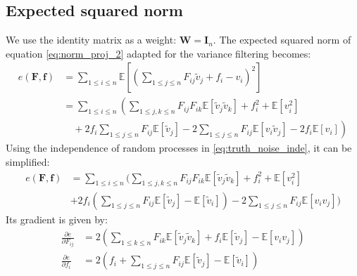 \documentclass[12pt]{scrartcl}
\begin{document}
\subsection{Expected squared norm}
We use the identity matrix as a weight: $\mathbf{W} = \mathbf{I}_n$. The expected squared norm of equation \eqref{eq:norm_proj_2} adapted for the variance filtering becomes:
\begin{align}
e(\mathbf{F},\mathbf{f}) & = \sum_{1 \le i \le n} \mathbb{E}\left[ \left(\sum_{1 \le j \le n} F_{ij} \widetilde{v}_j + f_i - v_i \right)^2 \right] \nonumber \\
& = \sum_{1 \le i \le n} \left( \sum_{1 \le j,k \le n} F_{ij} F_{ik} \mathbb{E}\left[\widetilde{v}_j \widetilde{v}_k\right] + f_i^2 + \mathbb{E}\left[v^2_i\right] \right.\nonumber \\
& \left. \quad + 2 f_i \sum_{1 \le j \le n} F_{ij} \mathbb{E}\left[\widetilde{v}_j\right] - 2 \sum_{1 \le j \le n} F_{ij} \mathbb{E}\left[v_i\widetilde{v}_j\right] - 2 f_i \mathbb{E}\left[v_i\right]\right)
\end{align}
Using the independence of random processes in \eqref{eq:truth_noise_inde}, it can be simplified:
\begin{align}
e(\mathbf{F},\mathbf{f}) & = \sum_{1 \le i \le n} \Bigg( \sum_{1 \le j,k \le n} F_{ij} F_{ik} \mathbb{E}\left[\widetilde{v}_j \widetilde{v}_k\right] + f_i^2 + \mathbb{E}\left[v^2_i\right] \nonumber \\
& + 2 f_i \left(\sum_{1 \le j \le n} F_{ij} \mathbb{E}\left[\widetilde{v}_j\right] - \mathbb{E}\left[\widetilde{v}_i\right]\right)- 2 \sum_{1 \le j \le n} F_{ij} \mathbb{E}\left[v_i v_j\right]\Bigg)
\end{align}
Its gradient is given by:
\begin{subequations}
\begin{align}
\label{eq:var_grad_1}
\frac{\partial e}{\partial F_{ij}} & = 2 \left(\sum_{1 \le k \le n}  F_{ik} \mathbb{E}\left[\widetilde{v}_j \widetilde{v}_k\right] + f_i \mathbb{E}\left[\widetilde{v}_j\right] - \mathbb{E}\left[v_i v_j\right]\right) \\
\frac{\partial e}{\partial f_i} & = 2 \left(f_i + \sum_{1 \le j \le n} F_{ij} \mathbb{E}\left[\widetilde{v}_j\right] - \mathbb{E}\left[\widetilde{v}_i\right]\right)
\end{align}
\end{subequations}
\end{document}
